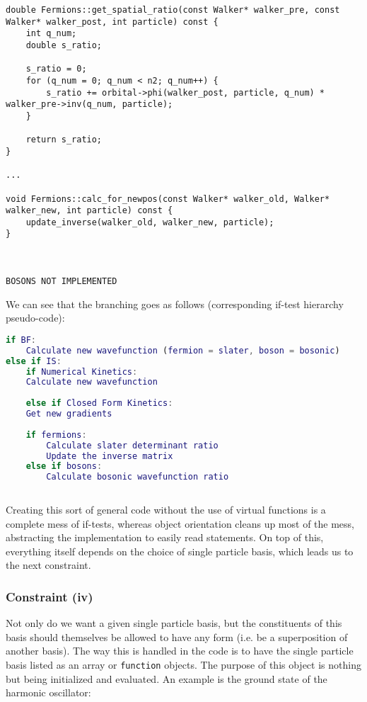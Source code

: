 \begin{lstlisting}
double Fermions::get_spatial_ratio(const Walker* walker_pre, const Walker* walker_post, int particle) const {
    int q_num;
    double s_ratio;

    s_ratio = 0;
    for (q_num = 0; q_num < n2; q_num++) {
        s_ratio += orbital->phi(walker_post, particle, q_num) * walker_pre->inv(q_num, particle);
    }

    return s_ratio;
}

...

void Fermions::calc_for_newpos(const Walker* walker_old, Walker* walker_new, int particle) const {
    update_inverse(walker_old, walker_new, particle);
}



BOSONS NOT IMPLEMENTED
\end{lstlisting}


We can see that the branching goes as follows (corresponding if-test hierarchy pseudo-code):

\begin{lstlisting}[language=Matlab]
if BF:
    Calculate new wavefunction (fermion = slater, boson = bosonic)
else if IS:
    if Numerical Kinetics:
	Calculate new wavefunction
	
    else if Closed Form Kinetics:
	Get new gradients 
	
	if fermions:
	    Calculate slater determinant ratio
	    Update the inverse matrix
	else if bosons:
	    Calculate bosonic wavefunction ratio
	
\end{lstlisting}

Creating this sort of general code without the use of virtual functions is a complete mess of if-tests, whereas object orientation cleans up most of the mess, abstracting the implementation to easily read statements. On top of this, everything itself depends on the choice of single particle basis, which leads us to the next constraint.

\subsubsection{Constraint (iv)}

Not only do we want a given single particle basis, but the constituents of this basis should themselves be allowed to have any form (i.e. be a superposition of another basis). The way this is handled in the code is to have the single particle basis listed as an array or \verb+function+ objects. The purpose of this object is nothing but being initialized and evaluated. An example is the ground state of the harmonic oscillator:

